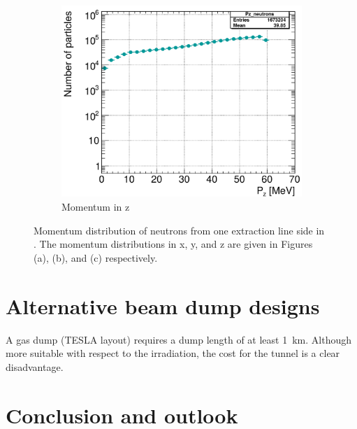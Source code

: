 \begin{figure}[h]
\begin{subfigure}[b]{0.32\textwidth}
   \centering
    \includegraphics[width=\textwidth]{Figures/BeamDump/neutrons_Pz.png}
   \caption{Momentum in z}
   \end{subfigure}
   \caption[Beam dump neutron momenta in \sid]{Momentum distribution of neutrons from one extraction line side in \sid.
   The momentum distributions in x, y, and z are given in Figures (a), (b), and (c) respectively.}
   \label{fig:BeamDumps:NeutronMom}
\end{figure} 

\section{Alternative beam dump designs}
A gas dump (TESLA layout) requires a dump length of at least \SI{1}{\kilo\meter}.
Although more suitable with respect to the irradiation, the cost for the tunnel is a clear disadvantage.
\section{Conclusion and outlook}